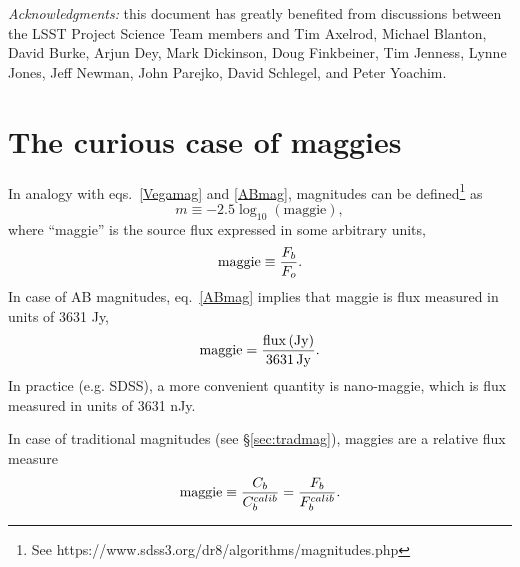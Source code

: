 \documentclass[DM,lsstdraft,toc,usenatbib]{lsstdoc}
\begin{document}
\vskip 0.0in
\newpage
\textit{Acknowledgments:} this document has greatly benefited from discussions between
the LSST Project Science Team members and Tim Axelrod, Michael Blanton, David
Burke, Arjun Dey, Mark Dickinson, Doug Finkbeiner, Tim Jenness, Lynne Jones,  Jeff Newman,
John Parejko, David Schlegel, and Peter Yoachim.


\appendix

\section{The curious case of maggies}

In analogy with eqs.~\ref{Vegamag} and \ref{ABmag}, magnitudes can be defined\footnote{
See https://www.sdss3.org/dr8/algorithms/magnitudes.php} as
\begin{equation}
\label{maggie}
               m \equiv - 2.5\log_{10}\left(\mathrm{maggie}\right),
\end{equation}
where ``maggie'' is the source flux expressed in some arbitrary
units,
\begin{equation}
\label{maggie2}
               \mathrm{maggie} \equiv {F_b \over F_o}.
\end{equation}
In case of AB magnitudes, eq.~\ref{ABmag} implies that maggie is
flux measured in units of 3631 Jy,
\begin{equation}
\label{eq:defmaggie}
           \mathrm{maggie} = {\mathrm{flux \, (Jy)} \over \mathrm{3631 \, Jy}}.
\end{equation}
In practice (e.g. SDSS), a more convenient
quantity is nano-maggie, which is flux measured in units of 3631 nJy.

In case of traditional magnitudes (see \S\ref{sec:tradmag}), maggies are a
relative flux measure
\begin{equation}
\label{maggie3}
    \mathrm{maggie} \equiv {C_b  \over C_b^{calib}} = {F_b  \over F_b^{calib}}.
\end{equation}
\end{document}
